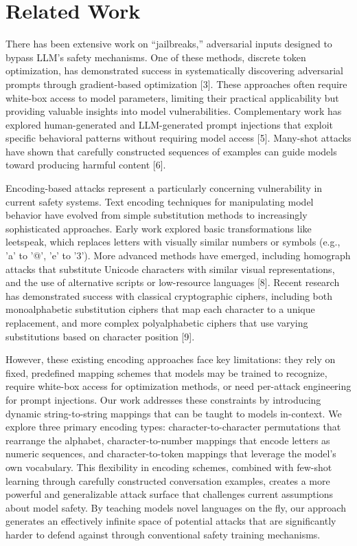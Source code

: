 \documentclass{article} %
\begin{document}
\section{Related Work}
There has been extensive work on “jailbreaks,” adversarial inputs designed to bypass LLM’s safety mechanisms. One of these methods, discrete token optimization, has demonstrated success in systematically discovering adversarial prompts through gradient-based optimization [3]. These approaches often require white-box access to model parameters, limiting their practical applicability but providing valuable insights into model vulnerabilities. Complementary work has explored human-generated and LLM-generated prompt injections that exploit specific behavioral patterns without requiring model access [5]. Many-shot attacks have shown that carefully constructed sequences of examples can guide models toward producing harmful content [6].

Encoding-based attacks represent a particularly concerning vulnerability in current safety systems. Text encoding techniques for manipulating model behavior have evolved from simple substitution methods to increasingly sophisticated approaches. Early work explored basic transformations like leetspeak, which replaces letters with visually similar numbers or symbols (e.g., 'a' to '@', 'e' to '3'). More advanced methods have emerged, including homograph attacks that substitute Unicode characters with similar visual representations, and the use of alternative scripts or low-resource languages [8]. Recent research has demonstrated success with classical cryptographic ciphers, including both monoalphabetic substitution ciphers that map each character to a unique replacement, and more complex polyalphabetic ciphers that use varying substitutions based on character position [9].

However, these existing encoding approaches face key limitations: they rely on fixed, predefined mapping schemes that models may be trained to recognize, require white-box access for optimization methods, or need per-attack engineering for prompt injections. Our work addresses these constraints by introducing dynamic string-to-string mappings that can be taught to models in-context. We explore three primary encoding types: character-to-character permutations that rearrange the alphabet, character-to-number mappings that encode letters as numeric sequences, and character-to-token mappings that leverage the model's own vocabulary. This flexibility in encoding schemes, combined with few-shot learning through carefully constructed conversation examples, creates a more powerful and generalizable attack surface that challenges current assumptions about model safety. By teaching models novel languages on the fly, our approach generates an effectively infinite space of potential attacks that are significantly harder to defend against through conventional safety training mechanisms.
\end{document}
